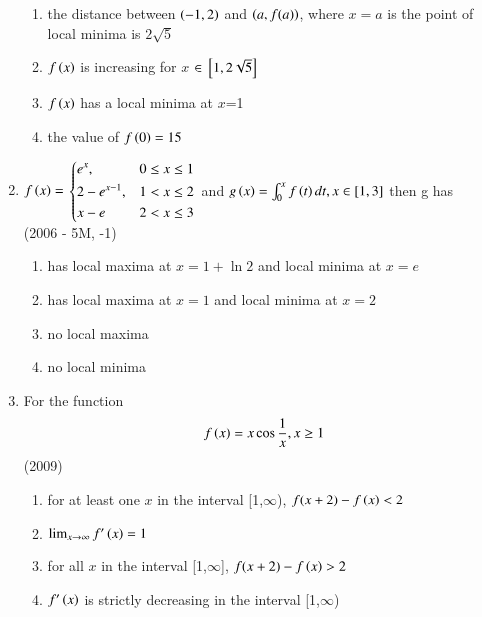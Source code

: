 \documentclass[journal,12pt,twocolumn]{IEEEtran}
\theoremstyle{remark}
\begin{document}
\begin{enumerate}
{            \begin{enumerate}
                \item the distance between $\left(-1,2\right)$ and $\left(a,f(a)\right)$, where $x=a$ is the point of local minima is $2\sqrt{5}$
                \item $f\left(x\right)$ is increasing for $x$ $\in {}\left[1,2\sqrt{5}\right]$
                \item $f\left(x\right)$ has a local minima at $x$=1
                \item the value of $f\left(0\right)=15$
            \end{enumerate}
        
        }
    \item{
        
            $f\left(x\right) = $    
            $\begin{dcases}%
                e^x, & 0 \leq x\leq 1 \\
                2-e^{x-1}, & 1 < x\leq 2 \\
                x-e & 2 < x\leq 3 \\
            \end{dcases}$ and $g\left(x\right) = \int_0^{x}f\left(t\right)dt, x \in[1,3]$ then g has
             \\ \text{   } \hfill
                {(2006 - 5M, -1)}
            
            \begin{enumerate}
                \item has local maxima at $x = 1+ \ln{2}$ and local minima at $x = e$
                \item has local maxima at $x = 1$ and local minima at $x = 2$
                \item no local maxima
                \item no local minima
            \end{enumerate}
        
        }
    \item{
        
            For the function $$f\left(x\right) = x\cos{\frac{1}{x}}, x\geq1$$
             \hfill
                {(2009)}
            
            \begin{enumerate}
                \item for at least one $x$ in the interval [1,$\infty$), $f(x+2)-f\left(x\right)<2$
                \item $\lim_{x\to\infty} f'\left(x\right) = 1$
                \item for all $x$ in the interval [1,$\infty$], $f(x+2)-f\left(x\right)>2$
                \item $f'\left(x\right)$ is strictly decreasing in the interval [1,$\infty$)
            \end{enumerate}
        
}
\end{enumerate}
\end{document}
